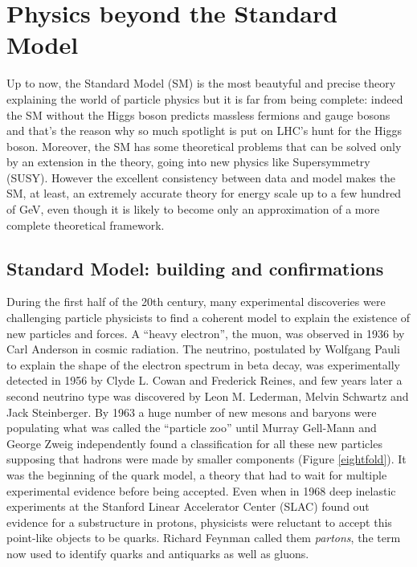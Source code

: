 
\clearpage{\pagestyle{empty}\cleardoublepage}

\chapter{Physics beyond the Standard Model}\label{chap:bsm}
Up to now, the Standard Model (SM) is the most beautyful and precise theory explaining the world of particle physics but it is far from being complete: indeed the SM without the Higgs boson predicts massless fermions and gauge bosons and that's the reason why so much spotlight is put on LHC's hunt for the Higgs boson. Moreover, the SM has some theoretical problems that can be solved only by an extension in the theory, going into new physics like Supersymmetry (SUSY). However the excellent consistency between data and model makes the SM, at least, an extremely accurate theory for energy scale up to a few hundred of GeV, even though it is likely to become only an approximation of a more complete theoretical framework.


\section{Standard Model: building and confirmations}
During the first half of the 20th century, many experimental discoveries were challenging particle physicists to find a coherent model to explain the existence of new particles and forces. A ``heavy electron'', the muon, was observed in 1936 by Carl Anderson in cosmic radiation. The neutrino, postulated by Wolfgang Pauli to explain the shape of the electron spectrum in beta decay, was experimentally detected in 1956 by Clyde L. Cowan and Frederick Reines, and few years later a second neutrino type was discovered by Leon M. Lederman, Melvin Schwartz and Jack Steinberger. By 1963 a huge number of new mesons and baryons were populating what was called the ``particle zoo'' until Murray Gell-Mann and George Zweig independently found a classification for all these new particles supposing that hadrons were made by smaller components (Figure \ref{eightfold}). It was the beginning of the quark model, a theory that had to wait for multiple experimental evidence before being accepted. Even when in 1968 deep inelastic experiments at the Stanford Linear Accelerator Center (SLAC) found out evidence for a substructure in protons, physicists were reluctant to accept this point-like objects to be quarks. Richard Feynman called them \textit{partons}, the term now used to identify quarks and antiquarks as well as gluons.

